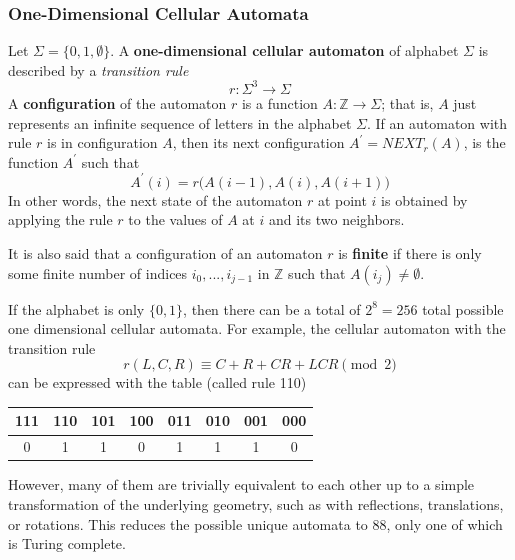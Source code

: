   \subsubsection{One-Dimensional Cellular Automata}
  \begin{definition}
    \label{def:one-dimensional-cellular-automaton}
  Let $\Sigma = \{0, 1, \emptyset\}$. A \textbf{one-dimensional cellular automaton} of alphabet $\Sigma$ is described by a \textit{transition rule}
  \begin{equation}
    r: \Sigma^3 \to \Sigma
  \end{equation}
  A \textbf{configuration} of the automaton $r$ is a function $A: \mathbb{Z} \to \Sigma$; that is, $A$ just represents an infinite sequence of letters in the alphabet $\Sigma$. If an automaton with rule $r$ is in configuration $A$, then its next configuration $A^\prime = NEXT_r (A)$, is the function $A^\prime$ such that 
  \begin{equation}
    A^\prime (i) = r\big( A(i-1), A(i), A(i+1)\big)
  \end{equation}
  In other words, the next state of the automaton $r$ at point $i$ is obtained by applying the rule $r$ to the values of $A$ at $i$ and its two neighbors. 

  It is also said that a configuration of an automaton $r$ is \textbf{finite} if there is only some finite number of indices $i_0, ..., i_{j-1}$ in $\mathbb{Z}$ such that $A(i_j) \neq \emptyset$. 
  \end{definition}

  If the alphabet is only $\{0, 1\}$, then there can be a total of $2^8 = 256$ total possible one dimensional cellular automata. For example, the cellular automaton with the transition rule
  \begin{equation}
    r(L, C, R) \equiv C + R + CR + LCR \pmod{2}
  \end{equation}
  can be expressed with the table (called rule 110)

  \begin{center}
  \begin{tabular}{c|c|c|c|c|c|c|c}
      111	&110	&101	&100	&011	&010	&001	&000 \\
      \hline
      0&1&1&0&1&1&1&0
  \end{tabular}
  \end{center}

  However, many of them are trivially equivalent to each other up to a simple transformation of the underlying geometry, such as with reflections, translations, or rotations. This reduces the possible unique automata to 88, only one of which is Turing complete. 

